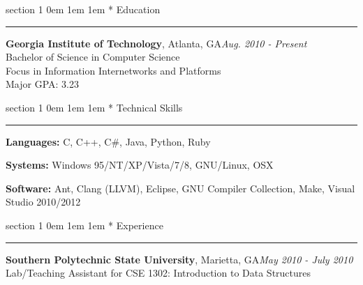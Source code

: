 \documentclass{article}
\makeatletter
\newcommand{\name}[1]{\def \@name {#1}}
\newcommand{\streetaddress}[1]{\def \@streetaddress {#1}}
\newcommand{\citystatezip}[1]{\def \@citystatezip {#1}}
\newcommand{\phone}[1]{\def \@phone {#1}}
\newcommand{\email}[1]{\def \@email {#1}}
\newcommand{\website}[1]{\def \@website {#1}}
\renewcommand{\section}[1]{
	\vspace{0.75em} %
	\@startsection
		{section}
		{1}
		{\z@}
		{0em}
		{1em \@minus 1em} %
		{\normalfont\large\sc\bfseries}
		*
		{#1}
	\vspace{-0.75em} %
	\hrule
	\vspace{0.25em} %
	\par
}
\newcommand{\entry}[1]{\def \@entry {#1}}
\newcommand{\dates}[1]{\def \@dates {#1}}
\newcommand{\location}[1]{\def \@location {#1}}
\newenvironment{locationentry}{
		\vspace{0.5em} %
		{\bf \@entry}, \@location \hfill {\it \@dates} \\
	}{}
\makeatother
\begin{document}
\name{Robert Kernan}
\phone{(770) 355-4050}
\streetaddress{16 Arbor Way Drive}
\citystatezip{Decatur, GA 30030}
\email{rkernan@gmail.com}
\website{robertkernan.com}

\maketitle

\thispagestyle{empty}

%
%

\section{Education}
\entry{Georgia Institute of Technology}
\location{Atlanta, GA}
\dates{Aug. 2010 - Present}
\begin{locationentry}
Bachelor of Science in Computer Science \\
Focus in Information Internetworks and Platforms \\
Major GPA: 3.23 \\
\par
\end{locationentry}

\section{Technical Skills}
\vspace{0.5em}
{\bf Languages:}
C, C++, C\#, Java, Python, Ruby

\vspace{0.25em}
{\bf Systems:}
Windows 95/NT/XP/Vista/7/8, GNU/Linux, OSX

\vspace{0.25em}
{\bf Software:}
Ant, Clang (LLVM), Eclipse, GNU Compiler Collection, Make, Visual Studio 2010/2012

\section{Experience}
\entry{Southern Polytechnic State University}
\location{Marietta, GA}
\dates{May 2010 - July 2010}
\begin{locationentry}
 Lab/Teaching Assistant for CSE 1302: Introduction to Data Structures
\end{locationentry}
\end{document}
